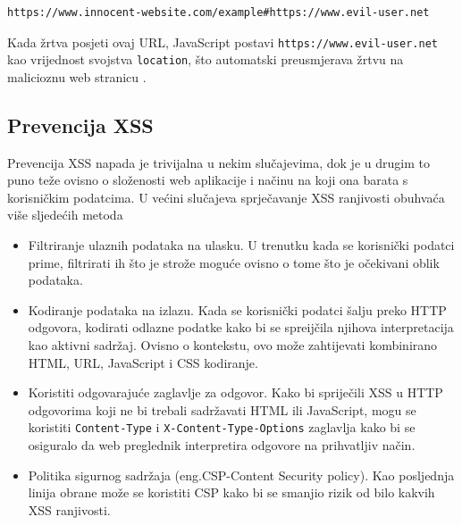 \documentclass[12pt, oneside, onecolumn]{book}
\begin{document}
{\begin{verbatim}
https://www.innocent-website.com/example#https://www.evil-user.net
\end{verbatim}

Kada žrtva posjeti ovaj URL, JavaScript postavi \texttt{https://www.evil-user.net} kao vrijednost svojstva \texttt{location}, što automatski preusmjerava žrtvu na malicioznu web stranicu \cite{xssdom}.

\subsection{Prevencija XSS}
Prevencija XSS napada je trivijalna u nekim slučajevima, dok je u drugim to puno teže ovisno o složenosti web aplikacije i načinu na koji ona barata s korisničkim podatcima. U većini slučajeva sprječavanje XSS ranjivosti obuhvaća više sljedećih metoda \cite{xssport}

\begin{itemize}
\item Filtriranje ulaznih podataka na ulasku. U trenutku kada se korisnički podatci prime, filtrirati ih što je strože moguće ovisno o tome što je očekivani oblik podataka.
\item Kodiranje podataka na izlazu. Kada se korisnički podatci šalju preko HTTP odgovora, kodirati odlazne podatke kako bi se spreijčila njihova interpretacija kao aktivni sadržaj. Ovisno o kontekstu, ovo može zahtijevati kombinirano HTML, URL, JavaScript i CSS kodiranje.
\item Koristiti odgovarajuće zaglavlje za odgovor. Kako bi spriječili XSS u HTTP odgovorima koji ne bi trebali sadržavati HTML ili JavaScript, mogu se koristiti \texttt{Content-Type} i \texttt{X-Content-Type-Options} zaglavlja kako bi se osiguralo da web preglednik interpretira odgovore na prihvatljiv način.
\item Politika sigurnog sadržaja (eng.CSP-Content Security policy). Kao posljednja linija obrane može se koristiti CSP kako bi se smanjio rizik od bilo kakvih XSS ranjivosti.
\end{itemize}

}
\end{document}
